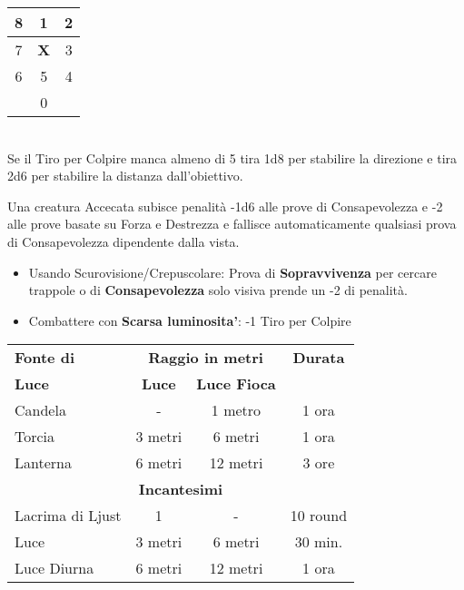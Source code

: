 \documentclass[landscape,10pt,a4paper]{article}
\begin{document}
\begin{multicols}{3}
\begin{dmbox}[title=Armi a spargimento - pagina \pageref{attacchiarmidaspargimento}]
\noindent\begin{tabular}{c|c|c}
8 &1 &2\\
\hline
7 &\textbf{X}& 3\\
\hline
6 &5& 4\\
\hline
&0&\\
\end{tabular}\\

Se il Tiro per Colpire manca almeno di 5 tira 1d8 per stabilire la direzione e tira 2d6 per stabilire la distanza dall'obiettivo.
\end{dmbox}

\begin{dmbox}[title=Visione - pagina \pageref{visioneeluce}]

Una creatura Accecata subisce penalità -1d6 alle prove di Consapevolezza e -2 alle prove basate su Forza e Destrezza e fallisce automaticamente qualsiasi prova di Consapevolezza dipendente dalla vista.

\begin{itemize}[leftmargin=0.5cm,itemsep=-1pt,parsep=0pt]
\item Usando Scurovisione/Crepuscolare: Prova di \textbf{Sopravvivenza} per cercare trappole o di \textbf{Consapevolezza} solo visiva prende un -2 di penalità.
\item Combattere con \textbf{Scarsa luminosita'}: -1 Tiro per Colpire
\end{itemize}
\end{dmbox}

\begin{dmbox}[title=Fonti di Luce - pagina \pageref{fontidiluce}]

\noindent\begin{tabular}{l|cc|c}
\textbf{Fonte di} &\multicolumn{2}{c}{\textbf{Raggio in metri}}& \textbf{Durata}  \\
\textbf{Luce}& \textbf{Luce} & \textbf{Luce Fioca} &\\
Candela & - & 1 metro & 1 ora\\
Torcia & 3 metri & 6 metri & 1 ora\\
Lanterna & 6 metri & 12 metri & 3 ore \\
\multicolumn{4}{c}{\textbf{Incantesimi}}\\
Lacrima di Ljust & 1 & - & 10 round\\
Luce  & 3 metri & 6 metri &30 min. \\
Luce Diurna & 6 metri & 12 metri & 1 ora 
\end{tabular}
\end{dmbox}


\end{multicols}
\end{document}
